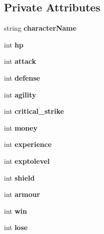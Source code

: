 \subsection*{Private Attributes}
\begin{DoxyCompactItemize}
\item 
\mbox{\label{class_player_ade3562b0b9a88c192f0349ac2cafce76}} 
string {\bfseries character\+Name}
\item 
\mbox{\label{class_player_a9159a0bdf10845c484a41823fe3c101e}} 
int {\bfseries hp}
\item 
\mbox{\label{class_player_a9912e57826c51a067ab34db854f31562}} 
int {\bfseries attack}
\item 
\mbox{\label{class_player_a63ed43151a54b62e9d59d8ef4edc0165}} 
int {\bfseries defense}
\item 
\mbox{\label{class_player_ae49bfbaba1583b695d12235263841f96}} 
int {\bfseries agility}
\item 
\mbox{\label{class_player_a5e3cf6dab1263ca2b4b6b94bbcddc788}} 
int {\bfseries critical\+\_\+strike}
\item 
\mbox{\label{class_player_aed37167e4117c2518a154e73fbfc103c}} 
int {\bfseries money}
\item 
\mbox{\label{class_player_a99cc9f5c9fad23b0ddab68ba4eb8eee4}} 
int {\bfseries experience}
\item 
\mbox{\label{class_player_af0a031857f4ade770c6f6688b0c41dc7}} 
int {\bfseries exptolevel}
\item 
\mbox{\label{class_player_af31f60ef7eedd89486623f26edb2b990}} 
int {\bfseries shield}
\item 
\mbox{\label{class_player_a51ccca43f3c0a2549e95bacf1b71e504}} 
int {\bfseries armour}
\item 
\mbox{\label{class_player_a9abe91f5084f15d7a11c7a77f345e517}} 
int {\bfseries win}
\item 
\mbox{\label{class_player_abbb49fe572e8c86068fe4f9d326ab07c}} 
int {\bfseries lose}
\end{DoxyCompactItemize}


